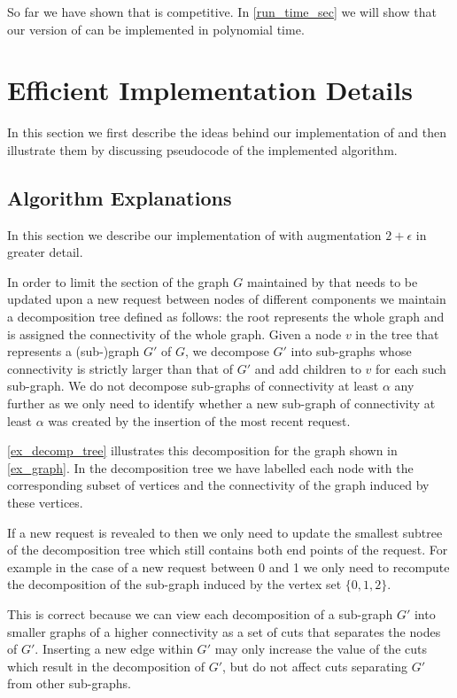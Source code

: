 \documentclass[a4paper,xcolor=dvipsnames, tikz, 12pt]{article}
\newcommand{\crep}{\text{C{\scriptsize REP}}}
\newcommand{\adjDel}{\text{C{\scriptsize REP}-A{\scriptsize DJ}}}
\theoremstyle{definition}
\begin{document}
So far we have shown that \crep{} is competitive. In \cref{run_time_sec} we will show that our version \adjDel{} of \crep{} can be implemented in polynomial time.


\section{Efficient Implementation Details}
\label{implDetSection}
In this section we first describe the ideas behind our implementation of \crep{} and then illustrate them by discussing pseudocode of the implemented algorithm.

\subsection{Algorithm Explanations}

In this section we describe our implementation of \crep{} with augmentation $2+\epsilon$ in greater detail.

In order to limit the section of the graph $G$ maintained by \crep{} that needs to be updated upon a new request between nodes of different components we maintain a decomposition tree defined as follows: the root represents the whole graph and is assigned the connectivity of the whole graph. Given a node $v$ in the tree that represents a (sub-)graph $G'$ of $G$, we decompose $G'$ into sub-graphs whose connectivity is strictly larger than that of $G'$ and add children to $v$ for each such sub-graph. We do not decompose sub-graphs of connectivity at least $\alpha$ any further as we only need to identify whether a new sub-graph of connectivity at least $\alpha$ was created by the insertion of the most recent request.

\cref{ex_decomp_tree} illustrates this decomposition for the graph shown in \cref{ex_graph}. In the decomposition tree we have labelled each node with the corresponding subset of vertices and the connectivity of the graph induced by these vertices.

If a new request is revealed to \crep{} then we only need to update the smallest subtree of the decomposition tree which still contains both end points of the request. For example in the case of a new request between 0 and 1 we only need to recompute the decomposition of the sub-graph induced by the vertex set $\{0,1,2\}$. 

This is correct because we can view each decomposition of a sub-graph $G'$ into smaller graphs of a higher connectivity as a set of cuts that separates the nodes of $G'$. Inserting a new edge within $G'$ may only increase the value of the cuts which result in the decomposition of $G'$, but do not affect cuts separating $G'$ from other sub-graphs.
\end{document}
